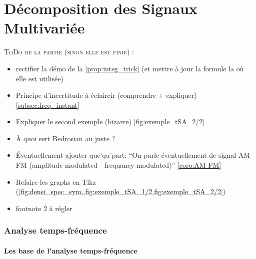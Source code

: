 \part{Décomposition des Signaux Multivariée}

\textsc{ToDo de  la partie (sinon elle est finie) :}
\begin{itemize}	
	
	\item rectifier la démo de la \cref{prop:integ_trick} (et mettre à jour la formule la où elle est utilisée)
	
	\item Principe d'incertitude à éclaircir (comprendre + expliquer) \cref{subsec:freq_instant}
	
	\item Expliquer le second exemple (bizarre) \cref{fig:exemple_tSA_2/2}
	
	\item \`A quoi sert Bedrosian au juste ? 
	
	\item \'Eventuellement ajouter que'qu'part: ``On parle éventuellement de signal AM-FM (amplitude modulated - frequancy modulated)'' \cref{coro:AM-FM}
	
	\item Refaire les graphs en Tikz (\cref{fig:densi_spec_sym,,fig:exemple_tSA_1/2,fig:exemple_tSA_2/2})
	
	\item footnote 2 à régler
	
\end{itemize}


\section{Analyse temps-fréquence}


\subsection{Les base de l'analyse temps-fréquence}\label{sec:temp-freq}


